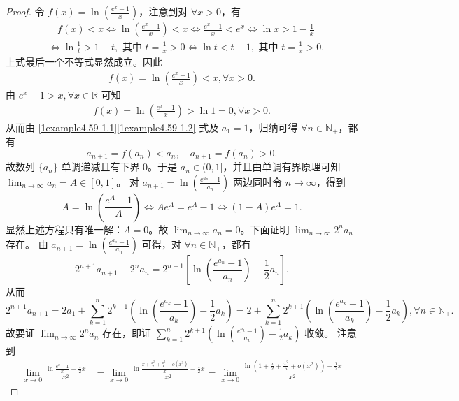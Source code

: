 \documentclass[lang=cn,newtx,10pt,scheme=chinese]{elegantbook}
\begin{document}
\begin{proof}
令 \(f(x)=\ln\left(\frac{e^x - 1}{x}\right)\)，注意到对 \(\forall x > 0\)，有
\begin{align*}
& \quad f(x) < x \Leftrightarrow \ln\left(\frac{e^x - 1}{x}\right) < x \Leftrightarrow \frac{e^x - 1}{x} < e^x \Leftrightarrow \ln x > 1 - \frac{1}{x}\\
&\Leftrightarrow \ln\frac{1}{t} > 1 - t,\text{ 其中 }t = \frac{1}{x} > 0 \Leftrightarrow \ln t < t - 1,\text{ 其中 }t = \frac{1}{x} > 0.
\end{align*}
上式最后一个不等式显然成立。因此
\begin{align}
f(x)=\ln\left(\frac{e^x - 1}{x}\right) < x,\forall x > 0. \label{1example4.59-1.1}  
\end{align}
由 \(e^x - 1 > x,\forall x \in \mathbb{R}\) 可知
\begin{align}
f(x)=\ln\left(\frac{e^x - 1}{x}\right) > \ln 1 = 0,\forall x > 0. \label{1example4.59-1.2}
\end{align}
从而由 \eqref{1example4.59-1.1}\eqref{1example4.59-1.2} 式及 \(a_1 = 1\)，归纳可得 \(\forall n \in \mathbb{N}_+\)，都有
\[
a_{n + 1} = f(a_n) < a_n,\quad a_{n + 1} = f(a_n) > 0.
\]
故数列 \(\{ a_n \}\) 单调递减且有下界 \(0\)。于是 \(a_n \in (0, 1]\)，并且由单调有界原理可知 \(\lim_{n \to \infty} a_n = A \in [0, 1]\)。
对 \(a_{n + 1} = \ln\left(\frac{e^{a_n} - 1}{a_n}\right)\) 两边同时令 \(n \to \infty\)，得到
\[
A = \ln\left(\frac{e^A - 1}{A}\right) \Leftrightarrow Ae^A = e^A - 1 \Leftrightarrow (1 - A)e^A = 1.
\]
显然上述方程只有唯一解：\(A = 0\)。故 \(\lim_{n \to \infty} a_n = 0\)。下面证明 \(\lim_{n \to \infty} 2^n a_n\) 存在。
由 \(a_{n + 1} = \ln\left(\frac{e^{a_n} - 1}{a_n}\right)\) 可得，对 \(\forall n \in \mathbb{N}_+\)，都有
\[
2^{n + 1} a_{n + 1} - 2^n a_n = 2^{n + 1}\left[\ln\left(\frac{e^{a_n} - 1}{a_n}\right) - \frac{1}{2} a_n\right].
\]
从而
\[
2^{n + 1} a_{n + 1} = 2a_1 + \sum_{k = 1}^n 2^{k + 1}\left(\ln\left(\frac{e^{a_k} - 1}{a_k}\right) - \frac{1}{2} a_k\right) = 2 + \sum_{k = 1}^n 2^{k + 1}\left(\ln\left(\frac{e^{a_k} - 1}{a_k}\right) - \frac{1}{2} a_k\right),\forall n \in \mathbb{N}_+.
\]
故要证 \(\lim_{n \to \infty} 2^n a_n\) 存在，即证 \(\sum_{k = 1}^n 2^{k + 1}\left(\ln\left(\frac{e^{a_k} - 1}{a_k}\right) - \frac{1}{2} a_k\right)\) 收敛。
注意到
\begin{align*}
\lim_{x\rightarrow 0} \frac{\ln \frac{e^x-1}{x}-\frac{1}{2}x}{x^2}&=\lim_{x\rightarrow 0} \frac{\ln \frac{x+\frac{x^2}{2}+\frac{x^3}{6}+o(x^3)}{x}-\frac{1}{2}x}{x^2}=\lim_{x\rightarrow 0} \frac{\ln \left( 1+\frac{x}{2}+\frac{x^2}{6}+o(x^2) \right) -\frac{1}{2}x}{x^2}

\end{align*}
\end{proof}
\end{document}
